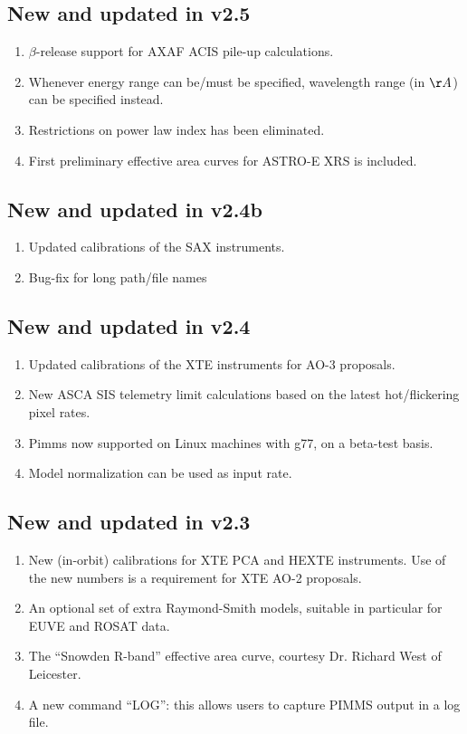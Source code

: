\subsection{New and updated in v2.5}

\begin{enumerate}
\item $\beta$-release support for AXAF ACIS pile-up calculations.
\item Whenever energy range can be/must be specified, wavelength range
	(in $\AA$) can be specified instead.
\item Restrictions on power law index has been eliminated.
\item First preliminary effective area curves for ASTRO-E XRS is included.
\end{enumerate}

\subsection{New and updated in v2.4b}

\begin{enumerate}
\item Updated calibrations of the SAX instruments.
\item Bug-fix for long path/file names
\end{enumerate}

\subsection{New and updated in v2.4}

\begin{enumerate}
\item Updated calibrations of the XTE instruments for AO-3 proposals.
\item New ASCA SIS telemetry limit calculations based on the latest
hot/flickering pixel rates.
\item Pimms now supported on Linux machines with g77, on a beta-test basis.
\item Model normalization can be used as input rate.
\end{enumerate}

\subsection{New and updated in v2.3}

\begin{enumerate}
\item New (in-orbit) calibrations for XTE PCA
and HEXTE instruments.  Use of the new numbers is a requirement for XTE
AO-2 proposals.
\item An optional set of extra Raymond-Smith models, suitable in particular
for EUVE and ROSAT data.
\item The ``Snowden R-band'' effective area curve, courtesy Dr. Richard
West of Leicester.
\item A new command ``LOG'': this allows users to capture PIMMS output in
a log file.
\end{enumerate}


